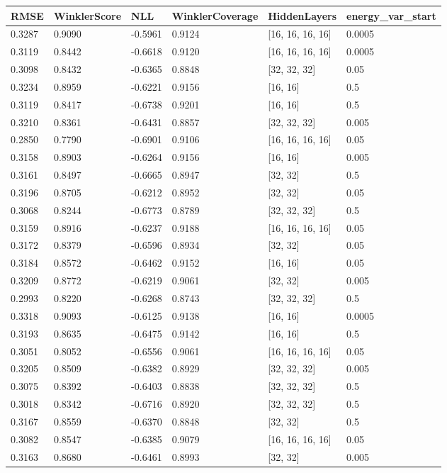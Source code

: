 \begin{tabular}{llllll}
\toprule
RMSE & WinklerScore & NLL & WinklerCoverage & HiddenLayers & energy_var_start \\
\midrule
0.3287 & 0.9090 & -0.5961 & 0.9124 & [16, 16, 16, 16] & 0.0005 \\
0.3119 & 0.8442 & -0.6618 & 0.9120 & [16, 16, 16, 16] & 0.0005 \\
0.3098 & 0.8432 & -0.6365 & 0.8848 & [32, 32, 32] & 0.05 \\
0.3234 & 0.8959 & -0.6221 & 0.9156 & [16, 16] & 0.5 \\
0.3119 & 0.8417 & -0.6738 & 0.9201 & [16, 16] & 0.5 \\
0.3210 & 0.8361 & -0.6431 & 0.8857 & [32, 32, 32] & 0.005 \\
0.2850 & 0.7790 & -0.6901 & 0.9106 & [16, 16, 16, 16] & 0.05 \\
0.3158 & 0.8903 & -0.6264 & 0.9156 & [16, 16] & 0.005 \\
0.3161 & 0.8497 & -0.6665 & 0.8947 & [32, 32] & 0.5 \\
0.3196 & 0.8705 & -0.6212 & 0.8952 & [32, 32] & 0.05 \\
0.3068 & 0.8244 & -0.6773 & 0.8789 & [32, 32, 32] & 0.5 \\
0.3159 & 0.8916 & -0.6237 & 0.9188 & [16, 16, 16, 16] & 0.05 \\
0.3172 & 0.8379 & -0.6596 & 0.8934 & [32, 32] & 0.05 \\
0.3184 & 0.8572 & -0.6462 & 0.9152 & [16, 16] & 0.05 \\
0.3209 & 0.8772 & -0.6219 & 0.9061 & [32, 32] & 0.005 \\
0.2993 & 0.8220 & -0.6268 & 0.8743 & [32, 32, 32] & 0.5 \\
0.3318 & 0.9093 & -0.6125 & 0.9138 & [16, 16] & 0.0005 \\
0.3193 & 0.8635 & -0.6475 & 0.9142 & [16, 16] & 0.5 \\
0.3051 & 0.8052 & -0.6556 & 0.9061 & [16, 16, 16, 16] & 0.05 \\
0.3205 & 0.8509 & -0.6382 & 0.8929 & [32, 32, 32] & 0.005 \\
0.3075 & 0.8392 & -0.6403 & 0.8838 & [32, 32, 32] & 0.5 \\
0.3018 & 0.8342 & -0.6716 & 0.8920 & [32, 32, 32] & 0.5 \\
0.3167 & 0.8559 & -0.6370 & 0.8848 & [32, 32] & 0.5 \\
0.3082 & 0.8547 & -0.6385 & 0.9079 & [16, 16, 16, 16] & 0.05 \\
0.3163 & 0.8680 & -0.6461 & 0.8993 & [32, 32] & 0.005 \\

\end{tabular}
